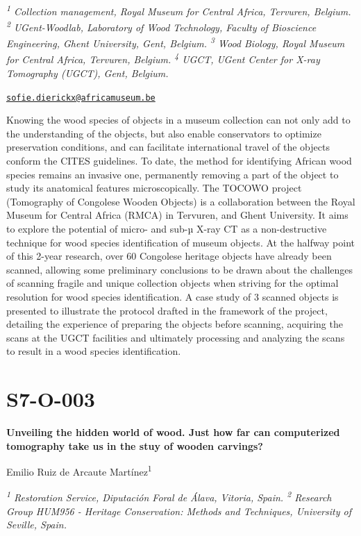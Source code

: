 \documentclass[
]{book}
\begin{document}
\emph{\textsuperscript{1} Collection management, Royal Museum for Central Africa, Tervuren, Belgium. \textsuperscript{2} UGent-Woodlab, Laboratory of Wood Technology, Faculty of Bioscience Engineering, Ghent University, Gent, Belgium. \textsuperscript{3} Wood Biology, Royal Museum for Central Africa, Tervuren, Belgium. \textsuperscript{4} UGCT, UGent Center for X-ray Tomography (UGCT), Gent, Belgium.}

\href{mailto:sofie.dierickx@africamuseum.be}{\nolinkurl{sofie.dierickx@africamuseum.be}}

Knowing the wood species of objects in a museum collection can not only add to the understanding of the objects, but also enable conservators to optimize preservation conditions, and can facilitate international travel of the objects conform the CITES guidelines. To date, the method for identifying African wood species remains an invasive one, permanently removing a part of the object to study its anatomical features microscopically. The TOCOWO project (Tomography of Congolese Wooden Objects) is a collaboration between the Royal Museum for Central Africa (RMCA) in Tervuren, and Ghent University. It aims to explore the potential of micro- and sub-µ X-ray CT as a non-destructive technique for wood species identification of museum objects. At the halfway point of this 2-year research, over 60 Congolese heritage objects have already been scanned, allowing some preliminary conclusions to be drawn about the challenges of scanning fragile and unique collection objects when striving for the optimal resolution for wood species identification. A case study of 3 scanned objects is presented to illustrate the protocol drafted in the framework of the project, detailing the experience of preparing the objects before scanning, acquiring the scans at the UGCT facilities and ultimately processing and analyzing the scans to result in a wood species identification.

\hypertarget{s7-o-003}{%
\section*{S7-O-003}\label{s7-o-003}}

\textbf{Unveiling the hidden world of wood. Just how far can computerized tomography take us in the stuy of wooden carvings?}

Emilio Ruiz de Arcaute Martínez\textsuperscript{1}

\emph{\textsuperscript{1} Restoration Service, Diputación Foral de Álava, Vitoria, Spain. \textsuperscript{2} Research Group HUM956 - Heritage Conservation: Methods and Techniques, University of Seville, Spain.}
\end{document}
